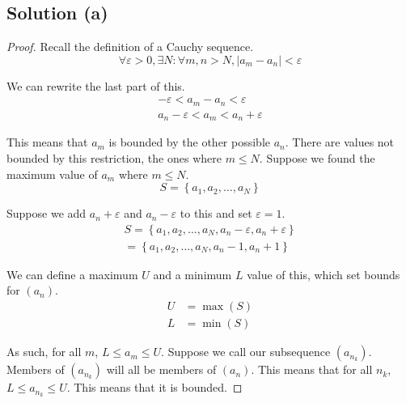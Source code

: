 \documentclass[12pt]{report}
\begin{document}
    \subsection{Solution (a)}
        \begin{proof}
            Recall the definition of a Cauchy sequence.
            \begin{equation}
                \forall\varepsilon > 0, \exists N : \forall m, n > N, \left| a_m - a_n \right| < \varepsilon
            \end{equation}

            We can rewrite the last part of this.
            \begin{gather}
                -\varepsilon < a_m - a_n < \varepsilon\\
                a_n - \varepsilon < a_m < a_n + \varepsilon
            \end{gather}

            This means that $a_m$ is bounded by the other possible $a_n$.
            There are values not bounded by this restriction, the ones where $m \leq N$.
            Suppose we found the maximum value of $a_m$ where $m \leq N$.
            \begin{equation}
                S = \left\{ a_1, a_2, \dots, a_N \right\}
            \end{equation}

            Suppose we add $a_n + \varepsilon$ and $a_n - \varepsilon$ to this and set $\varepsilon = 1$.
            \begin{multline}
                S   =   \left\{ a_1, a_2, \dots, a_N, a_n - \varepsilon, a_n + \varepsilon \right\}\\
                    =   \left\{ a_1, a_2, \dots, a_N, a_n - 1, a_n + 1 \right\}
            \end{multline}

            We can define a maximum $U$ and a minimum $L$ value of this, which set bounds for $(a_n)$.
            \begin{align}
                U &= \max(S)\\
                L &= \min(S)
            \end{align}

            As such, for all $m$, $L \leq a_m \leq U$.
            Suppose we call our subsequence $(a_{n_k})$.
            Members of $(a_{n_k})$ will all be members of $(a_n)$.
            This means that for all $n_k$, $L \leq a_{n_k} \leq U$.
            This means that it is bounded.
        \end{proof}
\end{document}
